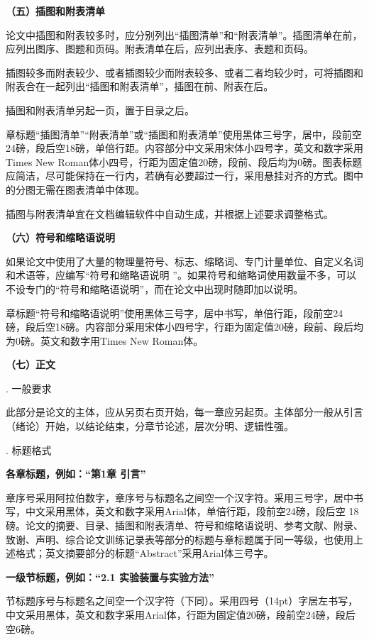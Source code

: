 \documentclass{Diploma}
\begin{document}
\noindent\textbf{（五）插图和附表清单}

论文中插图和附表较多时，应分别列出“插图清单”和“附表清单”。插图清单在前，应列出图序、图题和页码。附表清单在后，应列出表序、表题和页码。

插图较多而附表较少、或者插图较少而附表较多、或者二者均较少时，可将插图和附表合在一起列出“插图和附表清单”，插图在前、附表在后。

插图和附表清单另起一页，置于目录之后。

章标题“插图清单”“附表清单”或“插图和附表清单”使用黑体三号字，居中，段前空24磅，段后空18磅，单倍行距。内容部分中文采用宋体小四号字，英文和数字采用Times New Roman体小四号，行距为固定值20磅，段前、段后均为0磅。图表标题应简洁，尽可能保持在一行内，若确有必要超过一行，采用悬挂对齐的方式。图中的分图无需在图表清单中体现。

插图与附表清单宜在文档编辑软件中自动生成，并根据上述要求调整格式。

\noindent\textbf{（六）符号和缩略语说明}

如果论文中使用了大量的物理量符号、标志、缩略词、专门计量单位、自定义名词和术语等，应编写“符号和缩略语说明 ”。如果符号和缩略词使用数量不多，可以不设专门的“符号和缩略语说明”，而在论文中出现时随即加以说明。

章标题“符号和缩略语说明”使用黑体三号字，居中书写，单倍行距，段前空24 磅，段后空18磅。内容部分采用宋体小四号字，行距为固定值20磅，段前、段后均为0磅。英文和数字用Times New Roman体。

\noindent\textbf{（七）正文}

. 一般要求

此部分是论文的主体，应从另页右页开始，每一章应另起页。主体部分一般从引言（绪论）开始，以结论结束，分章节论述，层次分明、逻辑性强。

. 标题格式

\textbf{各章标题，例如：“第1章 引言”}

章序号采用阿拉伯数字，章序号与标题名之间空一个汉字符。采用三号字，居中书写，中文采用黑体，英文和数字采用Arial体，单倍行距，段前空24磅，段后空 18 磅。论文的摘要、目录、插图和附表清单、符号和缩略语说明、参考文献、附录、致谢、声明、综合论文训练记录表等部分的标题与章标题属于同一等级，也使用上述格式；英文摘要部分的标题“Abstract”采用Arial体三号字。

\textbf{一级节标题，例如：“2.1 实验装置与实验方法”}

节标题序号与标题名之间空一个汉字符（下同）。采用四号（14pt）字居左书写，中文采用黑体，英文和数字采用Arial体，行距为固定值20磅，段前空24磅，段后空6磅。
\end{document}
